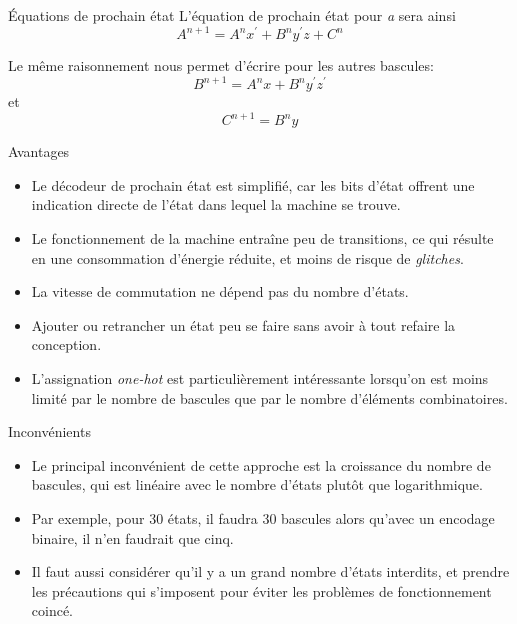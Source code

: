 \documentclass[presentation]{beamer}
\begin{document}
\begin{frame}[label={sec:orgde6527e}]{Équations de prochain état}
L'équation de prochain état pour \emph{a} sera ainsi 
$$
A^{n+1} = A^{n}x^\prime + B^n y^\prime z + C^n
$$

Le même raisonnement nous permet d'écrire pour les autres bascules:
$$
B^{n+1} = A^{n}x + B^n y^\prime z^\prime
$$
et 
$$
C^{n+1} = B^n y
$$
\end{frame}

\begin{frame}[label={sec:org5ccb6e4}]{Avantages}
\begin{itemize}
\item Le décodeur de prochain état est simplifié, car les bits d'état offrent une indication directe de l'état dans lequel la machine se trouve.

\item Le fonctionnement de la machine entraîne peu de transitions, ce qui résulte en une consommation d'énergie réduite, et moins de risque de \emph{glitches}.

\item La vitesse de commutation ne dépend pas du nombre d'états.

\item Ajouter ou retrancher un état peu se faire sans avoir à tout refaire la conception.

\item L'assignation \emph{one-hot} est particulièrement intéressante lorsqu'on est moins limité par le nombre de bascules que par le nombre d'éléments combinatoires.
\end{itemize}
\end{frame}

\begin{frame}[label={sec:org7cefe58}]{Inconvénients}
\begin{itemize}
\item Le principal inconvénient de cette approche est la croissance du nombre de bascules, qui est linéaire avec le nombre d'états plutôt que logarithmique.

\item Par exemple, pour 30 états, il faudra 30 bascules alors qu'avec un encodage binaire, il n'en faudrait que cinq.

\item Il faut aussi considérer qu'il y a un grand nombre d'états interdits, et prendre les précautions qui s'imposent pour éviter les problèmes de fonctionnement coincé.
\end{itemize}
\end{frame}
\end{document}
